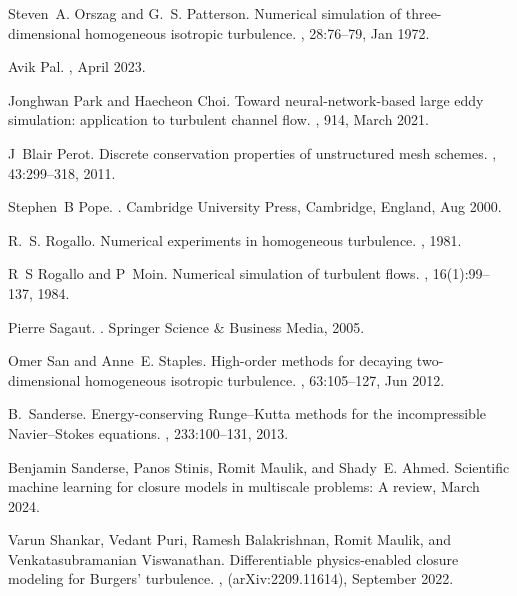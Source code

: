 \documentclass[preprint]{elsarticle}
\begin{document}
\begin{thebibliography}{10}
Steven~A. Orszag and G.~S. Patterson.
\newblock Numerical simulation of three-dimensional homogeneous isotropic turbulence.
, 28:76--79, Jan 1972.

Avik Pal.
, April 2023.

Jonghwan Park and Haecheon Choi.
\newblock Toward neural-network-based large eddy simulation: application to turbulent channel flow.
, 914, March 2021.

J~Blair Perot.
\newblock Discrete conservation properties of unstructured mesh schemes.
, 43:299--318, 2011.

Stephen~B Pope.
.
\newblock Cambridge University Press, Cambridge, England, Aug 2000.

R.~S. Rogallo.
\newblock Numerical experiments in homogeneous turbulence.
, 1981.

R~S Rogallo and P~Moin.
\newblock Numerical simulation of turbulent flows.
, 16(1):99--137, 1984.

Pierre Sagaut.
.
\newblock Springer Science \& Business Media, 2005.

Omer San and Anne~E. Staples.
\newblock High-order methods for decaying two-dimensional homogeneous isotropic turbulence.
, 63:105–127, Jun 2012.

B.~Sanderse.
\newblock Energy-conserving {R}unge–{K}utta methods for the incompressible {N}avier–{S}tokes equations.
, 233:100--131, 2013.

Benjamin Sanderse, Panos Stinis, Romit Maulik, and Shady~E. Ahmed.
\newblock Scientific machine learning for closure models in multiscale problems: A review, March 2024.

Varun Shankar, Vedant Puri, Ramesh Balakrishnan, Romit Maulik, and Venkatasubramanian Viswanathan.
\newblock Differentiable physics-enabled closure modeling for {{Burgers}}' turbulence.
, (arXiv:2209.11614), September 2022.


\end{thebibliography}
\end{document}
